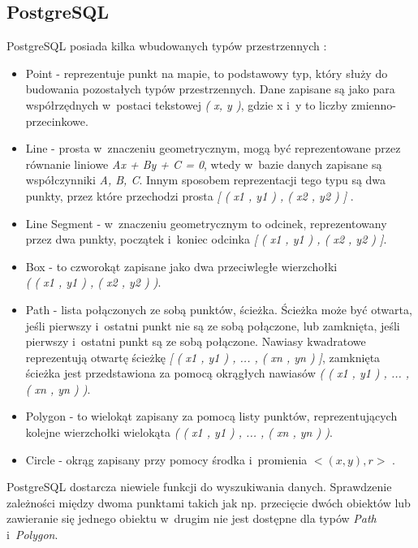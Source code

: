 \documentclass[archivemode]{mgr}
\begin{document}
\subsection{PostgreSQL}
PostgreSQL posiada kilka wbudowanych typów przestrzennych \cite{doc_postgresql}: 
\begin{itemize}
  \item Point - reprezentuje punkt na mapie, to podstawowy typ, który służy do budowania pozostałych typów przestrzennych. Dane zapisane są jako para współrzędnych w~postaci tekstowej \textit{( x, y )}, gdzie x i~y to liczby zmienno-przecinkowe.
  \item Line - prosta w~znaczeniu geometrycznym, mogą być reprezentowane przez równanie liniowe \textit{Ax + By + C = 0}, wtedy w~bazie danych zapisane są współczynniki \textit{A, B, C}. Innym sposobem reprezentacji tego typu są dwa punkty, przez które przechodzi prosta \textit{[ ( x1 , y1 ) , ( x2 , y2 ) ]
  }.
  \item Line Segment - w~znaczeniu geometrycznym to odcinek, reprezentowany przez dwa punkty, początek i~koniec odcinka \textit{[ ( x1 , y1 ) , ( x2 , y2 ) ]}.
  \item Box - to czworokąt zapisane jako dwa przeciwległe wierzchołki\\ \textit{( ( x1 , y1 ) , ( x2 , y2 ) )}.
  \item Path - lista połączonych ze sobą punktów, ścieżka. Ścieżka może być otwarta, jeśli pierwszy i~ostatni punkt nie są ze sobą połączone, lub zamknięta, jeśli pierwszy i~ostatni punkt są ze sobą połączone. Nawiasy kwadratowe reprezentują otwartę ścieżkę \textit{[ ( x1 , y1 ) , ... , ( xn , yn ) ]}, zamknięta ścieżka jest przedstawiona za pomocą okrągłych nawiasów \textit{( ( x1 , y1 ) , ... , ( xn , yn ) )}.
  \item Polygon - to wielokąt zapisany za pomocą listy punktów, reprezentujących kolejne wierzchołki wielokąta \textit{( ( x1 , y1 ) , ... , ( xn , yn ) )}.
  \item Circle - okrąg zapisany przy pomocy środka i~promienia \textit{  $< ( x , y ) , r >$ }.
\end{itemize}
PostgreSQL dostarcza niewiele funkcji do wyszukiwania danych. Sprawdzenie zależności między dwoma punktami takich jak np. przecięcie dwóch obiektów lub zawieranie się jednego obiektu w~drugim nie jest dostępne dla typów \textit{Path} i~\textit{Polygon}. 
\end{document}
